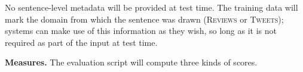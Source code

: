 \documentclass[11pt]{article}
\newcommand{\ensuretext}[1]{#1}
\newcommand{\nssmarker}{\ensuretext{\textcolor{magenta}{\ensuremath{^{\textsc{NS}}_{\textsc{S}}}}}}
\newcommand{\dhmarker}{\ensuretext{\textcolor{red}{\ensuremath{^{\textsc{D}}_{\textsc{H}}}}}}
\newcommand{\arkcomment}[3]{\ensuretext{\textcolor{#3}{[#1 #2]}}}
\newcommand{\nss}[1]{\arkcomment{\nssmarker}{#1}{magenta}}
\newcommand{\dirk}[1]{\arkcomment{\dhmarker}{#1}{red}}
\newcommand{\longversion}[1]{} %
\begin{document}
\longversion{The sentences provided for this task are tokenized. 
For evaluation to be possible, system predictions must respect the input tokenization.}

No sentence-level metadata will be provided at test time. 
The training data will mark the domain from which the sentence was drawn 
(\textsc{Reviews} or \textsc{Tweets}); systems can make use of this information as they wish, 
so long as it is not required as part of the input at test time.



\textbf{Measures.}
The evaluation script will compute three kinds of scores.
\end{document}
